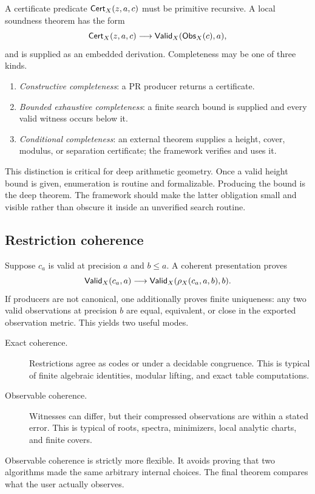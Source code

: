 A certificate predicate \(\mathsf{Cert}_X(z,a,c)\) must be primitive recursive.  A
local soundness theorem has the form
\[
 \mathsf{Cert}_X(z,a,c)\longrightarrow \mathsf{Valid}_X(\mathsf{Obs}_X(c),a),
\]
and is supplied as an embedded derivation.  Completeness may be one of three
kinds.

\begin{enumerate}
\item \emph{Constructive completeness}: a PR producer returns a certificate.
\item \emph{Bounded exhaustive completeness}: a finite search bound is
supplied and every valid witness occurs below it.
\item \emph{Conditional completeness}: an external theorem supplies a
height, cover, modulus, or separation certificate; the framework verifies and
uses it.
\end{enumerate}

This distinction is critical for deep arithmetic geometry.  Once a valid
height bound is given, enumeration is routine and formalizable.  Producing the
bound is the deep theorem.  The framework should make the latter obligation
small and visible rather than obscure it inside an unverified search routine.

\subsection{Restriction coherence}

Suppose \(c_a\) is valid at precision \(a\) and \(b\leq a\).  A coherent
presentation proves
\[
 \mathsf{Valid}_X(c_a,a)\longrightarrow
 \mathsf{Valid}_X(\rho_X(c_a,a,b),b).
\]
If producers are not canonical, one additionally proves finite uniqueness:
any two valid observations at precision \(b\) are equal, equivalent, or close
in the exported observation metric.  This yields two useful modes.

\begin{description}
\item[Exact coherence.] Restrictions agree as codes or under a decidable
congruence.  This is typical of finite algebraic identities, modular lifting,
and exact table computations.
\item[Observable coherence.] Witnesses can differ, but their compressed
observations are within a stated error.  This is typical of roots, spectra,
minimizers, local analytic charts, and finite covers.
\end{description}

Observable coherence is strictly more flexible.  It avoids proving that two
algorithms made the same arbitrary internal choices.  The final theorem
compares what the user actually observes.

